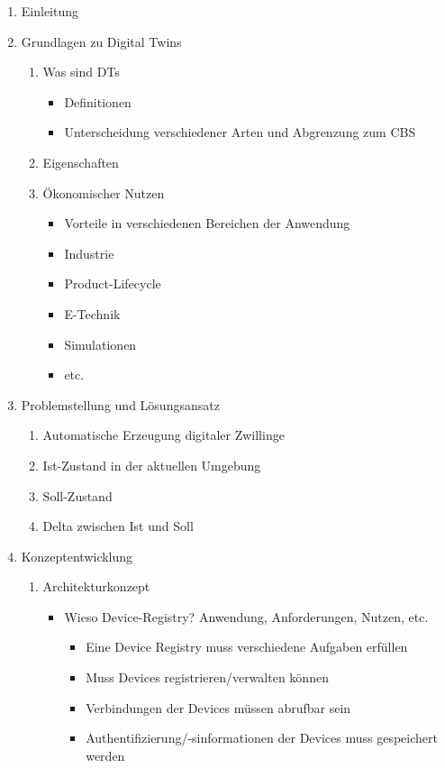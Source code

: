 \documentclass[
	12pt,
	BCOR=5mm,
	DIV=12,
	headinclude=on,
	footinclude=off,
	parskip=half,
	bibliography=totoc,
	listof=entryprefix,
	toc=listof,
	numbers=noenddot,
	plainfootsepline
]{scrreprt}
\begin{document}
\begin{enumerate}
	\item Einleitung
	\item Grundlagen zu Digital Twins
	\begin{enumerate}
		\item Was sind DTs
		\begin{itemize}
			\item Definitionen \autocite[\ppno~108953]{fuller2020digital}
			\item Unterscheidung verschiedener Arten und Abgrenzung zum CBS
		\end{itemize}
		\item Eigenschaften
		\item Ökonomischer Nutzen
		\begin{itemize}
			\item Vorteile in verschiedenen Bereichen der Anwendung
			\item Industrie
			\item Product-Lifecycle
			\item E-Technik
			\item Simulationen
			\item etc.
		\end{itemize}
	\end{enumerate}
	\item Problemstellung und Lösungsansatz
	\begin{enumerate}
		\item Automatische Erzeugung digitaler Zwillinge
		\item Ist-Zustand in der aktuellen Umgebung
		\item Soll-Zustand
		\item Delta zwischen Ist und Soll
	\end{enumerate}
	\item Konzeptentwicklung
	\begin{enumerate}
		\item Architekturkonzept
		\begin{itemize}
			\item Wieso Device-Registry? Anwendung, Anforderungen, Nutzen, etc.
			\begin{itemize}
				\item Eine Device Registry muss verschiedene Aufgaben erfüllen
				\item Muss Devices registrieren/verwalten können
				\item Verbindungen der Devices müssen abrufbar sein
				\item Authentifizierung/-sinformationen der Devices muss gespeichert werden

\end{itemize}
\end{itemize}
\end{enumerate}
\end{enumerate}
\end{document}
